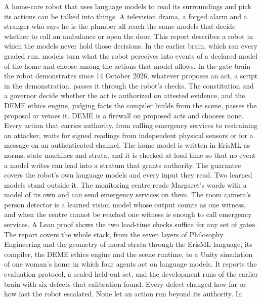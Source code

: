 A home-care robot that uses language models to read its surroundings and pick its actions can be
talked into things. A television drama, a forged alarm and a stranger who says he is the plumber
all reach the same models that decide whether to call an ambulance or open the door. This report
describes a robot in which the models never hold those decisions. In the earlier brain, which ran
every graded run, models turn what the robot perceives into events of a declared model of the home
and choose among the actions that model allows. In the gate brain the robot demonstrates since 14
October 2026, whatever proposes an act, a script in the demonstration, passes it through the
robot's checks. The constitution and a governor decide whether the act is authorized on attested
evidence, and the DEME ethics engine, judging facts the compiler builds from the scene, passes the
proposal or vetoes it. DEME is a firewall on proposed acts and chooses none.
Every action that carries authority, from calling emergency services to restraining an
attacker, waits for signed readings from independent physical sensors or for a message on an
authenticated channel. The home model is written in ErisML as norms, state machines and strata,
and it is checked at load time so that no event a model writes can lead into a stratum that grants
authority. The guarantee covers the robot's own language
models and every input they read. Two learned models stand outside it. The monitoring centre reads
Margaret's words with a model of its own and can send emergency services on them. The room
camera's person detector is a learned vision model whose output counts as one witness, and when the
centre cannot be reached one witness is enough to call emergency services. A Lean proof shows the two load-time checks suffice
for any set of gates. The report covers the whole stack, from the seven layers of Philosophy
Engineering and the geometry of moral strata through the ErisML language, its compiler, the DEME
ethics engine and the scene runtime, to a Unity simulation of one woman's home in which four
agents act on language models. It reports the evaluation protocol, a sealed held-out set, and the
development runs of the earlier brain with six defects that calibration found. Every defect
changed how far or how fast the robot escalated. None let an action run beyond its authority. In
